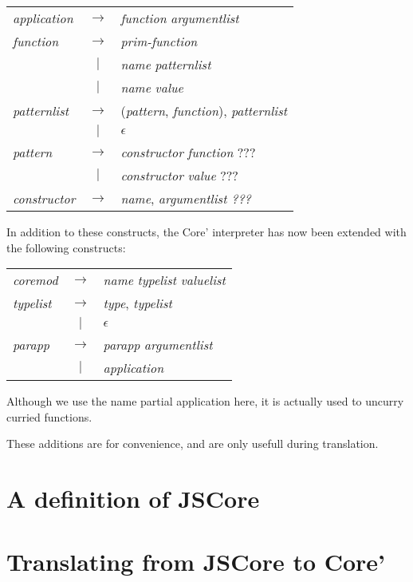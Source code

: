 \begin{longtable}{ l c l }

\emph{application} 	& $\rightarrow$ & \emph{function} \emph{argumentlist} \\

\emph{function} 	& $\rightarrow$ & \emph{prim-function} \\
			& $|$ 		& \emph{name} \emph{patternlist} \\
			& $|$ 		& \emph{name} \emph{value} \\

\emph{patternlist} 	& $\rightarrow$ & (\emph{pattern}, \emph{function}), 
\emph{patternlist} \\
			& $|$ 		& $\epsilon$ \\

\emph{pattern} 		& $\rightarrow$ & \emph{constructor} \emph{function} ??? \\
			& $|$ 		& \emph{constructor} \emph{value} ??? \\

\emph{constructor} 	& $\rightarrow$ & \emph{name}, \emph{argumentlist ???} \\

\end{longtable}

In addition to these constructs, the Core' interpreter has now been 
extended with the following constructs:

\begin{longtable}{ l c l }

\emph{coremod} 		& $\rightarrow$ & \emph{name} \emph{typelist} \emph{valuelist}\\

\emph{typelist}		& $\rightarrow$ & \emph{type}, \emph{typelist} \\
			& $|$		& $\epsilon$ \\

\emph{parapp} 		& $\rightarrow$ & \emph{parapp} \emph{argumentlist} \\
			& $|$ 		& \emph{application} \\

\end{longtable}

Although we use the name partial application here, it is actually used to
uncurry curried functions.

These additions are for convenience, and are only usefull during 
translation.





\section{A definition of JSCore}



\section{Translating from JSCore to Core'}

